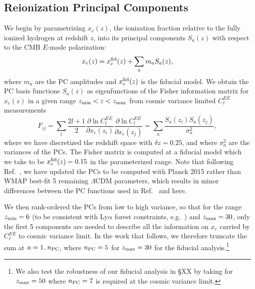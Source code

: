 \documentclass[prd,twocolumn,amsmath,amssymb,floatfix,superscriptaddress,nofootinbib]{revtex4-1}
\newcommand{\xef}{x_e^{\rm fid}}
\newcommand{\beq}{\begin{equation}}
\newcommand{\eeq}{\end{equation}}
\begin{document}
\subsection{Reionization Principal Components}
\label{sec:PC}
We begin by parametrizing $x_e(z)$, the ionization fraction relative to the fully ionized hydrogen at redshift $z$, into its principal components $S_{a}(z)$ with respect to the CMB $E$-mode polarization:
%
\begin{equation}
x_e(z)=\xef(z)+\sum_{a}m_{a}S_{a}(z),
\label{eq:mmutoxe}
\end{equation}
%
where $m_a$ are the PC amplitudes and $\xef(z)$ is the fiducial model. We obtain the PC basis functions $S_{a}(z)$ as eigenfunctions of the Fisher information matrix for $x_e(z)$ in a given range $z_{\rm min}<z<z_{\rm max}$ from cosmic variance limited $C_\ell^{EE}$ measurements 
%
\beq
F_{ij} = \sum_l \frac{2 l+1}{2} \frac{\partial \ln C_l^{EE}}{\partial x_e(z_i)}\frac{\partial \ln C_l^{EE}}{\partial x_e(z_j)} = \sum_a \frac{ S_a(z_i) S_a(z_j)}{\sigma_a^2},
\eeq
%
where we have discretized the redshift space with $\delta z= 0.25$, and where $\sigma_a^2$ are the variances of the PCs.
The Fisher matrix is computed at a fiducial model which we take to be $x_e^{\rm fid}(z)=0.15$ in the parameterized range.
 Note that following Ref.~\cite{Heinrich:2018btc}, we have updated the PCs to be computed with Planck 2015 rather than WMAP best-fit 5 remaining $\Lambda$CDM parameters, which results in minor differences between the PC functions used in Ref.~\cite{Heinrich:2016ojb} and here. 


We then rank-ordered the PCs from low to high variance, so that for the range $z_{\rm min} = 6$ (to be consistent with Ly$\alpha$ forest constraints, e.g.~\cite{Becker:2015lua}) and $z_{\rm max} = 30$, only the first 5 components are needed to describe all the information on $x_e$ carried by $C_\ell^{EE}$ to cosmic variance limit. In the work that follows, we therefore truncate the sum at $a = 1 .. n_{\rm{PC}}$, where $n_{\rm{PC}} = 5$ for $z_{\rm max} = 30$ for the fiducial analysis.\footnote{We also test the robustness of our fiducial analysis in \S XX by  taking 
 for $z_{\rm max} = 50$ where $n_{\rm{PC}} = 7$ is required at the cosmic variance limit.}   
 
 
 
\end{document}
